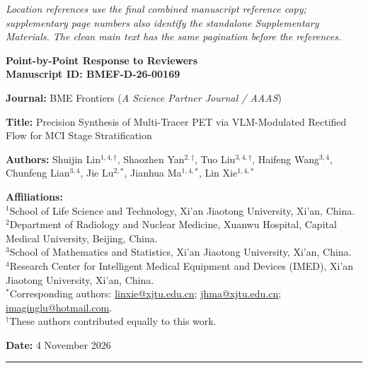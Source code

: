 \documentclass[11pt]{article}
\begin{document}
\noindent\textit{Location references use the final combined manuscript reference copy; supplementary page numbers also identify the standalone Supplementary Materials. The clean main text has the same pagination before the references.}\par


\thispagestyle{empty}

\vspace*{0.8cm}
{\LARGE\bfseries\color{HeaderColor}
  Point-by-Point Response to Reviewers\\[6pt]
  \large\normalfont\color{black}
  Manuscript ID: \textbf{BMEF-D-26-00169}
}

\vspace{0.6cm}
\noindent\textbf{Journal:} BME Frontiers (\textit{A Science Partner Journal / AAAS})

\noindent\textbf{Title:} Precision Synthesis of Multi-Tracer PET via VLM-Modulated Rectified Flow for MCI Stage Stratification

\noindent\textbf{Authors:} Shuijin Lin$^{1,4,\dagger}$, Shaozhen Yan$^{2,\dagger}$, Tuo Liu$^{3,4,\dagger}$, Haifeng Wang$^{3,4}$, Chunfeng Lian$^{3,4}$, Jie Lu$^{2,*}$, Jianhua Ma$^{1,4,*}$, Lin Xie$^{1,4,*}$

\noindent\textbf{Affiliations:}\\
{\small
$^1$School of Life Science and Technology, Xi'an Jiaotong University, Xi'an, China.\\
$^2$Department of Radiology and Nuclear Medicine, Xuanwu Hospital, Capital Medical University, Beijing, China.\\
$^3$School of Mathematics and Statistics, Xi'an Jiaotong University, Xi'an, China.\\
$^4$Research Center for Intelligent Medical Equipment and Devices (IMED), Xi'an Jiaotong University, Xi'an, China.\\
$^*$Corresponding authors: \href{mailto:linxie@xjtu.edu.cn}{linxie@xjtu.edu.cn}; \href{mailto:jhma@xjtu.edu.cn}{jhma@xjtu.edu.cn}; \href{mailto:imaginglu@hotmail.com}{imaginglu@hotmail.com}.\\
$^\dagger$These authors contributed equally to this work.
}

\noindent\textbf{Date:} 4 November 2026

\vspace{0.8cm}
\noindent\rule{\linewidth}{1.2pt}



\clearpage


\clearpage


\clearpage


\clearpage


\clearpage


\end{document}
